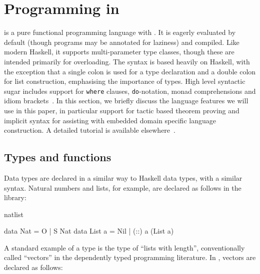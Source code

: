 \section{Programming in \Idris{}}

\label{sect:idris}

\Idris{} is a pure functional programming language with . It is eagerly evaluated by default (though programs may be annotated
for laziness) and compiled.  Like modern Haskell, it supports multi-parameter
type classes, though these are intended primarily for overloading. The syntax
is based heavily on Haskell, with the exception that a single colon is used for
a type declaration and a double colon for list construction, emphasising the
importance of types.  High level syntactic sugar includes support for
\texttt{where} clauses, \texttt{do}-notation, monad comprehensions and idiom
brackets~\cite{McBride2007}. In this section, we briefly discuss the language
features we will use in this paper, in particular support for tactic
based theorem proving and implicit syntax for assisting with 
embedded domain specific language construction. A detailed tutorial
is available elsewhere~\cite{idristutorial}.


\subsection{Types and functions}

Data types are declared in a similar way to Haskell data types, with a similar
syntax. Natural numbers and lists, for example, are declared as follows in the
library:

\begin{SaveVerbatim}{natlist}

data Nat    = O   | S Nat           
data List a = Nil | (::) a (List a) 

\end{SaveVerbatim}

A standard example of a  type is the type of ``lists with
length'', conventionally called ``vectors'' in the dependently typed
programming literature. In \Idris{}, vectors are declared as follows:

